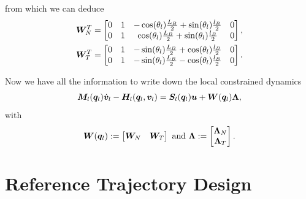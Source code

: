 \documentclass[../DC2017114Bouma.tex]{subfiles}
\begin{document}
from which we can deduce
\begin{align}
{\boldsymbol{W}}_N^T &= \begin{bmatrix}
0 & 1 & -\cos(\theta_l)\frac{L_B}{2} + \sin(\theta_l)\frac{l_B}{2} & 0 \\
0 & 1 & \cos(\theta_l)\frac{L_B}{2} + \sin(\theta_l)\frac{l_B}{2} & 0
\end{bmatrix},\\
{\boldsymbol{W}}_T^T &= \begin{bmatrix}
0 & 1 & -\sin(\theta_l)\frac{L_B}{2} + \cos(\theta_l)\frac{l_B}{2} & 0 \\
0 & 1 & -\sin(\theta_l)\frac{L_B}{2} - \cos(\theta_l)\frac{l_B}{2} & 0
\end{bmatrix}.
\end{align}

Now we have all the information to write down the local constrained dynamics
\begin{align}
{\boldsymbol{M}}_l({\boldsymbol{q}}_l)\dot{{\boldsymbol{v}}}_l - {\boldsymbol{H}}_l({\boldsymbol{q}}_l,{\boldsymbol{v}}_l) = {\boldsymbol{S}}_l({\boldsymbol{q}}_l){\boldsymbol{u}} + {\boldsymbol{W}}({\boldsymbol{q}}_l)\boldsymbol{\Lambda},\label{eq:localcontdyn}
\end{align}
with
\begin{align}
{\boldsymbol{W}}({\boldsymbol{q}}_l) := \begin{bmatrix}
{\boldsymbol{W}}_N & {\boldsymbol{W}}_T
\end{bmatrix}\text{ and }\boldsymbol{\Lambda} := \begin{bmatrix}
\boldsymbol{\Lambda}_N\\
\boldsymbol{\Lambda}_T
\end{bmatrix}.
\end{align}

\section{Reference Trajectory Design}
\end{document}
